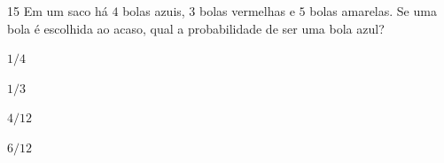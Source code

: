 
\num{15} Em um saco há $4$ bolas azuis, $3$ bolas vermelhas e $5$ bolas amarelas.
Se uma bola é escolhida ao acaso, qual a probabilidade de ser uma bola
azul?

\begin{escolha}
\item
  $1/4$
\item
  $1/3$
\item
  $4/12$
\item
  $6/12$
\end{escolha}





